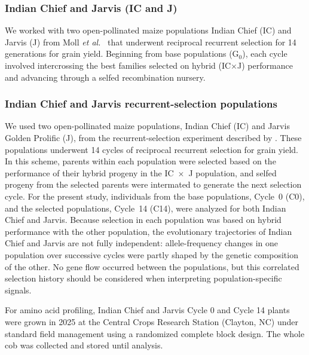 \subsubsection{Indian Chief and Jarvis (IC and J)  }
We worked with two open-pollinated maize populations Indian Chief (IC) and Jarvis (J) from Moll \textit{et al.}~\citep{Moll1994} that underwent reciprocal recurrent selection for 14 generations for grain yield. Beginning from base populations (G$_0$), each cycle involved intercrossing the best families selected on hybrid (IC$\times$J) performance and advancing through a selfed recombination nursery.

\subsubsection{Indian Chief and Jarvis recurrent-selection populations}

We used two open-pollinated maize populations, Indian Chief (IC) and Jarvis Golden Prolific (J), from the recurrent-selection experiment described by \citet{Moll1994}. These populations underwent 14 cycles of reciprocal recurrent selection for grain yield. In this scheme, parents within each population were selected based on the performance of their hybrid progeny in the IC~$\times$~J population, and selfed progeny from the selected parents were intermated to generate the next selection cycle. For the present study, individuals from the base populations, Cycle~0 (C0), and the selected populations, Cycle~14 (C14), were analyzed for both Indian Chief and Jarvis. Because selection in each population was based on hybrid performance with the other population, the evolutionary trajectories of Indian Chief and Jarvis are not fully independent: allele-frequency changes in one population over successive cycles were partly shaped by the genetic composition of the other. No gene flow occurred between the populations, but this correlated selection history should be considered when interpreting population-specific signals.

For amino acid profiling, Indian Chief and Jarvis Cycle 0 and Cycle 14 plants were grown in 2025 at the Central Crops Research Station (Clayton, NC) under standard field management using a randomized complete block design. The whole cob was collected and stored until analysis.

